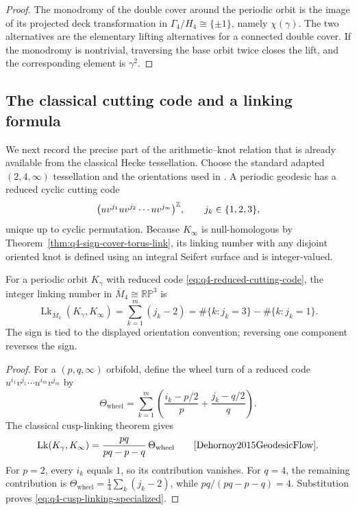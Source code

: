 \begin{proof}
The monodromy of the double cover around the periodic orbit is the image of its
projected deck transformation in
\(\Gamma_4/H_4\cong\{\pm1\}\), namely \(\chi(\gamma)\).  The two alternatives
are the elementary lifting alternatives for a connected double cover.  If the
monodromy is nontrivial, traversing the base orbit twice closes the lift, and the
corresponding element is \(\gamma^2\).
\end{proof}

\subsection{The classical cutting code and a linking formula}

We next record the precise part of the arithmetic--knot relation that is already
available from the classical Hecke tessellation.  Choose the standard adapted
\((2,4,\infty)\) tessellation and the orientations used in
\cite{Dehornoy2015GeodesicFlow}.  A periodic geodesic has a reduced cyclic
cutting code
\begin{equation}
 \bigl(u v^{j_1}u v^{j_2}\cdots u v^{j_m}\bigr)^{\mathbb{Z}},
 \qquad j_k\in\{1,2,3\},
 \label{eq:q4-reduced-cutting-code}
\end{equation}
unique up to cyclic permutation.
Because \(K_\infty\) is null-homologous by
Theorem~\ref{thm:q4-sign-cover-torus-link}, its linking number with any disjoint
oriented knot is defined using an integral Seifert surface and is integer-valued.

\begin{theorem}[The \(q=4\) cusp-linking formula]
\label{thm:q4-cusp-linking-code}
For a periodic orbit \(K_\gamma\) with reduced code
\eqref{eq:q4-reduced-cutting-code}, the integer linking number in
\(\overline M_4\cong\mathbb {RP}^3\) is
\begin{equation}
 \operatorname{Lk}_{\overline M_4}(K_\gamma,K_\infty)
 =\sum_{k=1}^m(j_k-2)
 =\#\{k:j_k=3\}-\#\{k:j_k=1\}.
 \label{eq:q4-cusp-linking-specialized}
\end{equation}
The sign is tied to the displayed orientation convention; reversing one component
reverses the sign.
\end{theorem}

\begin{proof}
For a \((p,q,\infty)\) orbifold, define the wheel turn of a reduced code
\(u^{i_1}v^{j_1}\cdots u^{i_m}v^{j_m}\) by
\[
 \Theta_{\mathrm{wheel}}
 =\sum_{k=1}^m
 \left(\frac{i_k-p/2}{p}+\frac{j_k-q/2}{q}\right).
\]
The classical cusp-linking theorem gives
\[
 \operatorname{Lk}(K_\gamma,K_\infty)
 =\frac{pq}{pq-p-q}\,\Theta_{\mathrm{wheel}}
 \qquad\text{\cite[Proposition~5.7]{Dehornoy2015GeodesicFlow}}.
\]
For \(p=2\), every \(i_k\) equals \(1\), so its contribution vanishes.  For
\(q=4\), the remaining contribution is
\(\Theta_{\mathrm{wheel}}=\frac14\sum_k(j_k-2)\), while
\(pq/(pq-p-q)=4\).  Substitution proves
\eqref{eq:q4-cusp-linking-specialized}.
\end{proof}

